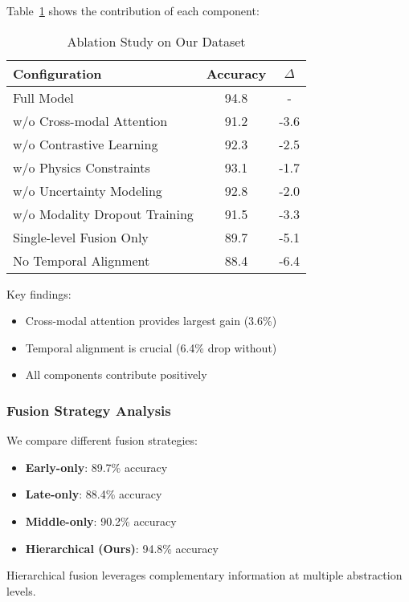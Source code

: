 \documentclass[journal]{IEEEtran}
\begin{document}
Table~\ref{tab:ablation} shows the contribution of each component:

\begin{table}[t]
\centering
\caption{Ablation Study on Our Dataset}
\label{tab:ablation}
\begin{tabular}{lcc}
\toprule
Configuration & Accuracy & $\Delta$ \\
\midrule
Full Model & 94.8 & - \\
\midrule
w/o Cross-modal Attention & 91.2 & -3.6 \\
w/o Contrastive Learning & 92.3 & -2.5 \\
w/o Physics Constraints & 93.1 & -1.7 \\
w/o Uncertainty Modeling & 92.8 & -2.0 \\
w/o Modality Dropout Training & 91.5 & -3.3 \\
\midrule
Single-level Fusion Only & 89.7 & -5.1 \\
No Temporal Alignment & 88.4 & -6.4 \\
\bottomrule
\end{tabular}
\end{table}

Key findings:
\begin{itemize}
\item Cross-modal attention provides largest gain (3.6\%)
\item Temporal alignment is crucial (6.4\% drop without)
\item All components contribute positively
\end{itemize}

\subsubsection{Fusion Strategy Analysis}

We compare different fusion strategies:

\begin{itemize}
\item \textbf{Early-only}: 89.7\% accuracy
\item \textbf{Late-only}: 88.4\% accuracy
\item \textbf{Middle-only}: 90.2\% accuracy
\item \textbf{Hierarchical (Ours)}: 94.8\% accuracy
\end{itemize}

Hierarchical fusion leverages complementary information at multiple abstraction levels.
\end{document}
